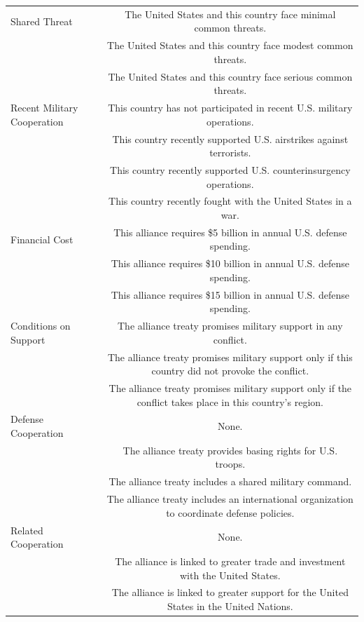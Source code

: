 \documentclass[12pt]{article}
\begin{document}
\begin{table}
\begin{adjustbox}{width = .99\textwidth}
\begin{tabular}{lc}
Shared Threat       & The United States and this country face minimal common threats. \\ 
                    & The United States and this country face modest common threats. \\
                    & The United States and this country face serious common threats. \\
                    
Recent Military Cooperation  & This country has not participated in recent U.S. military operations. \\ 
                    & This country recently supported U.S. airstrikes against terrorists. \\
                    & This country recently supported U.S. counterinsurgency operations. \\
                    & This country recently fought with the United States in a war. \\
                    
Financial Cost      & This alliance requires \$5 billion in annual U.S. defense spending.  \\ 
                    & This alliance requires \$10 billion in annual U.S. defense spending.  \\ 
                    & This alliance requires \$15 billion in annual U.S. defense spending.  \\ 
                    
Conditions on Support  & The alliance treaty promises military support in any conflict. \\ 
                    & The alliance treaty promises military support only if this country did not provoke the conflict. \\ 
                    & The alliance treaty promises military support only if the conflict takes place in this country's region. \\
                    
Defense Cooperation & None. \\ 
                    & The alliance treaty provides basing rights for U.S. troops. \\
                    & The alliance treaty includes a shared military command. \\
                    & The alliance treaty includes an international organization to coordinate defense policies.  \\ 
Related Cooperation & None. \\
                    & The alliance is linked to greater trade and investment with the United States. \\ 
                    & The alliance is linked to greater support for the United States in the United Nations. \\ 
                    

\end{tabular}
\end{adjustbox}
\end{table}
\end{document}
